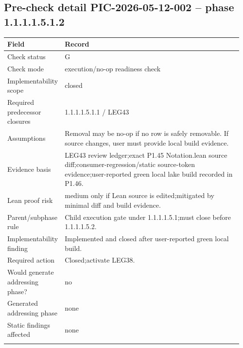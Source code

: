 \subsection*{Pre-check detail PIC-2026-05-12-002 -- phase 1.1.1.1.5.1.2}
\begin{longtable}{L{0.18\linewidth} L{0.78\linewidth}}
\hline
\textbf{Field} & \textbf{Record}\\
\hline
Check status & G\\
\hline\addlinespace[0.20em]
Check mode & execution/\allowbreak{}no-op readiness check\\
\hline\addlinespace[0.20em]
Implementability scope & closed\\
\hline\addlinespace[0.20em]
Required predecessor closures & 1.1.1.1.5.1.1 /\allowbreak{} LEG43\\
\hline\addlinespace[0.20em]
Assumptions & Removal may be no-op if no row is safely removable. If source changes, user must provide local build evidence.\\
\hline\addlinespace[0.20em]
Evidence basis & LEG43 review ledger;\newline exact P1.45 Notation.lean source diff;\newline consumer-regression/\allowbreak{}static source-token evidence;\newline user-reported green local lake build recorded in P1.46.\\
\hline\addlinespace[0.20em]
Lean proof risk & medium only if Lean source is edited;\newline mitigated by minimal diff and build evidence.\\
\hline\addlinespace[0.20em]
Parent/\allowbreak{}subphase rule & Child execution gate under 1.1.1.1.5.1;\newline must close before 1.1.1.1.5.2.\\
\hline\addlinespace[0.20em]
Implementability finding & Implemented and closed after user-reported green local build.\\
\hline\addlinespace[0.20em]
Required action & Closed;\newline activate LEG38.\\
\hline\addlinespace[0.20em]
Would generate addressing phase? & no\\
\hline\addlinespace[0.20em]
Generated addressing phase & none\\
\hline\addlinespace[0.20em]
Static findings affected & none\\
\hline\addlinespace[0.20em]
\end{longtable}
\normalsize
